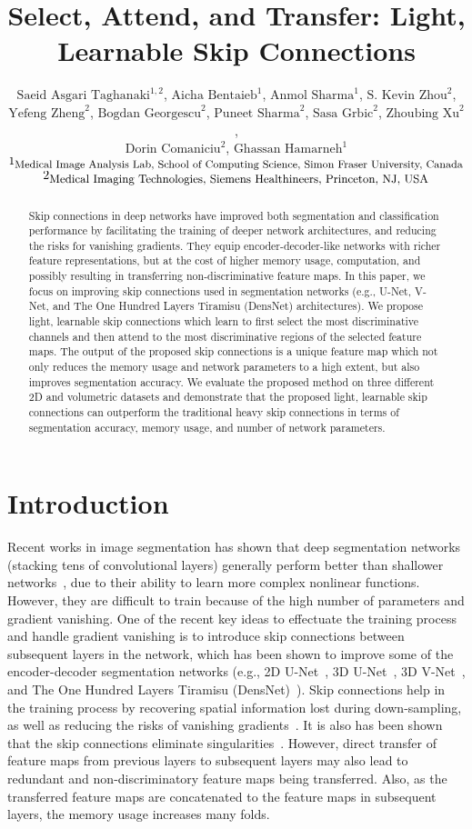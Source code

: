 \documentclass{article}
\title{Select, Attend, and Transfer: Light, Learnable Skip Connections}
\author{
$\text{Saeid Asgari Taghanaki}^{1,2}$, $\text{Aicha Bentaieb}^{1}$, $\text{Anmol Sharma}^{1}$, $\text{S. Kevin Zhou}^{2}$, \\ \textbf{$\text{Yefeng Zheng}^{2}$}, \textbf{$\text{Bogdan Georgescu}^{2}$}, \textbf{$\text{Puneet Sharma}^{2}$}, \textbf{$\text{Sasa Grbic}^{2}$}, \textbf{$\text{Zhoubing Xu}^{2}$}, \\ \textbf{$\text{Dorin Comaniciu}^{2}$}, \textbf{$\text{Ghassan Hamarneh}^{1}$} \\
    $\scriptsize{1} _\text{\small{Medical Image Analysis Lab, School of Computing Science, Simon Fraser University, Canada}}$ \\
    $\scriptsize{2} _\text{\small{Medical Imaging Technologies, Siemens Healthineers, Princeton, NJ, USA}}$
}
\begin{document}

\maketitle

\begin{abstract}
  Skip connections in deep networks have improved both segmentation and classification performance by facilitating the training of deeper network architectures, and reducing the risks for vanishing gradients. They equip encoder-decoder-like networks with richer feature representations, but at the cost of higher memory usage, computation, and possibly resulting in transferring non-discriminative feature maps. In this paper, we focus on improving  skip connections used in segmentation networks (e.g., U-Net, V-Net, and The One Hundred Layers Tiramisu (DensNet) architectures). We propose light, learnable skip connections which learn to first select the most discriminative channels and then attend to the most discriminative regions of the selected feature maps. The output of the proposed skip connections is a unique feature map which not only reduces the memory usage and network parameters to a high extent, but also improves segmentation accuracy. We evaluate the proposed method on three different 2D and volumetric datasets and demonstrate that the proposed light, learnable skip connections can outperform the traditional heavy skip connections in terms of segmentation accuracy, memory usage, and number of network parameters.
\end{abstract}

\section{Introduction}


Recent works in image segmentation has shown that deep segmentation networks (stacking tens of convolutional layers) generally perform better than shallower networks~\cite{he2016deep}, due to their ability to learn more complex nonlinear functions. However, they are difficult to train because of the high number of parameters and gradient vanishing. One of the recent key ideas to effectuate the training process and handle gradient vanishing is to introduce skip connections between subsequent layers in the network, which has been shown to improve some of the encoder-decoder segmentation networks (e.g., 2D U-Net~\cite{ronneberger2015u}, 3D U-Net~\cite{cciccek20163d}, 3D V-Net~\cite{milletari2016v}, and The One Hundred Layers Tiramisu (DensNet)~\cite{jegou2017one}). Skip connections help in the training process by recovering spatial information lost during down-sampling, as well as reducing the risks of vanishing gradients~\cite{huang2017densely}. It is also has been shown that the skip connections eliminate singularities~\cite{orhan2017skip}. However, direct transfer of feature maps from previous layers to subsequent layers may also lead to redundant and non-discriminatory feature maps being transferred. Also, as the transferred feature maps are concatenated to the feature maps in subsequent layers, the memory usage increases many folds.
\end{document}
